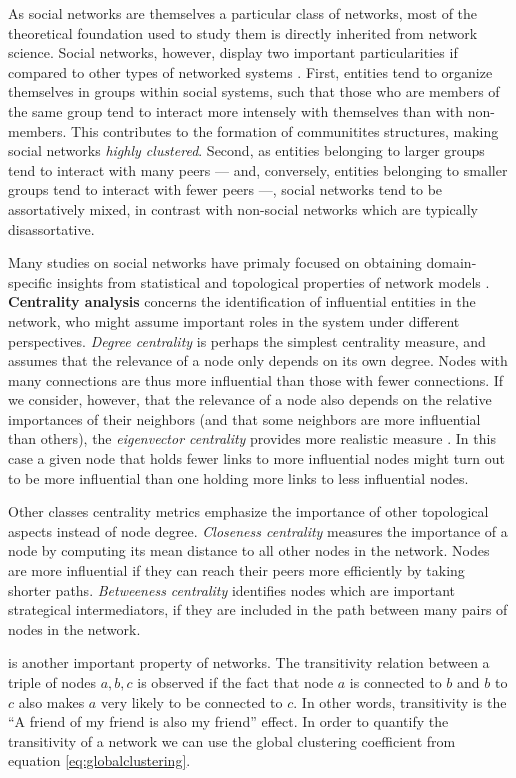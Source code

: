 As social networks are themselves a particular class of networks, most of the theoretical foundation used to study them is directly inherited from network science.
%
Social networks, however, display two important particularities if compared to other types of networked systems \cite{Newman2003d}.
First, entities tend to organize themselves in groups within social systems, such that those who are members of the same group tend to interact more intensely with themselves than with non-members.
This contributes to the formation of communitites structures, making social networks \textit{highly clustered}.
Second, as entities belonging to larger groups tend to interact with many peers --- and, conversely, entities belonging to smaller groups tend to interact with fewer peers ---, social networks tend to be assortatively mixed, in contrast with non-social networks which are typically disassortative.  

Many studies on social networks have primaly focused on obtaining domain-specific insights from statistical and topological properties of network models \cite{Newman2003b}.
\textbf{Centrality analysis} concerns the identification of influential entities in the network, who might assume important roles in the system under different perspectives.
\textit{Degree centrality} is perhaps the simplest centrality measure, and assumes that the relevance of a node only depends on its own degree. Nodes with many connections are thus more influential than those with fewer connections.
If we consider, however, that the relevance of a node also depends on the relative importances of their neighbors (and that some neighbors are more influential than others), the \textit{eigenvector centrality} provides more realistic measure \cite{Bonacich1987}.
In this case a given node that holds fewer links to more influential nodes might turn out to be more influential than one holding more links to less influential nodes.

Other classes centrality metrics emphasize the importance of other topological aspects instead of node degree.
\textit{Closeness centrality} measures the importance of a node by computing its mean distance to all other nodes in the network. Nodes are more influential if they can reach their peers more efficiently by taking shorter paths.
\textit{Betweeness centrality} identifies nodes which are important strategical intermediators, if they are included in the path between many pairs of nodes in the network.  

 is another important property of networks. 
The transitivity relation between a triple of nodes ${a,b,c}$ is observed if the fact that node $a$ is connected to $b$ and $b$ to $c$ also makes $a$ very likely to be connected to $c$. 
In other words, transitivity is the ``A friend of my friend is also my friend'' effect.
In order to quantify the transitivity of a network we can use the global clustering coefficient from equation \ref{eq:globalclustering}.

